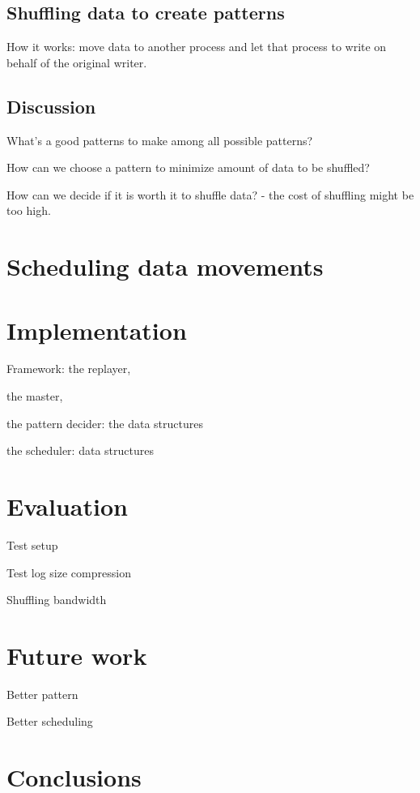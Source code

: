\documentclass{acm_proc_article-sp}
\begin{document}
\subsection{Shuffling data to create patterns}
How it works: move data to another process and let
that process to write on behalf of the original writer.

\subsection{Discussion}
What's a good patterns to make among 
all possible patterns?

How can we choose a pattern to minimize
amount of data to be shuffled?

How can we decide if it is worth it to
shuffle data? - the cost of shuffling might be
too high.




\section{Scheduling data movements}


\section{Implementation}

Framework: 
the replayer, 

the master, 

the pattern decider: the data structures

the scheduler: data structures


\section{Evaluation}
Test setup

Test log size compression

Shuffling bandwidth


\section{Future work}
Better pattern

Better scheduling


\section{Conclusions}






  
\end{document}
